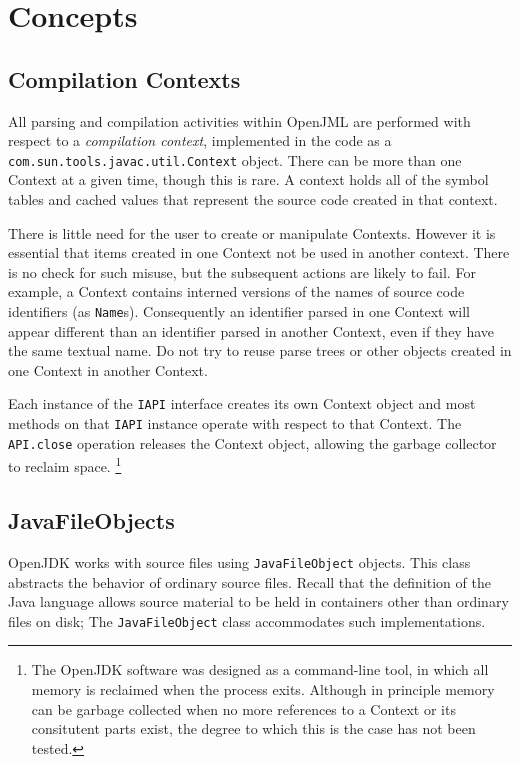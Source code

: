 \section{Concepts}

\subsection{Compilation Contexts}
All parsing and compilation activities within OpenJML are performed with respect to a {\em compilation context},
implemented in the code as a {\tt com.sun.tools.javac.util.Context} object. There can be more than one Context at a given time,
though this is rare. A context holds all of the symbol tables and cached values that represent the source code created
in that context. 

There is little need for the user to create or manipulate
Contexts. However it is essential that items created in one Context not be used in another context. There is no check for such misuse, but the subsequent actions are likely to fail. For example, a Context contains interned versions of the names of
source code identifiers (as {\tt Name}s). Consequently an identifier parsed in one Context will 
appear different than an identifier
parsed in another Context, even if they have the same textual name. Do not try to reuse parse trees or other objects 
created in one Context in another Context.
 
Each instance of the {\tt IAPI} interface creates its own Context object and most methods on 
that {\tt IAPI} instance operate with respect to that Context. The {\tt API.close} operation 
releases the Context object, allowing the garbage collector to reclaim space.
\footnote{The OpenJDK software was designed as a command-line tool, in which all memory is reclaimed
when the process exits. Although in principle memory can be garbage collected when no more references
to a Context or its consitutent parts exist, the degree to which this is the case has not been tested.}

\label{JavaFileObjects}
\subsection{JavaFileObjects}

OpenJDK works with source files using {\tt JavaFileObject} objects. This class abstracts the behavior of 
ordinary source files. Recall that the definition of the Java language allows source material to be held 
in containers other than ordinary files on disk; The {\tt JavaFileObject} class accommodates such implementations.


